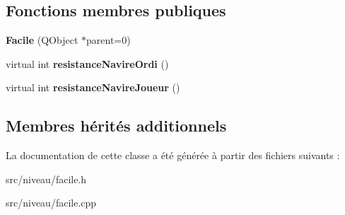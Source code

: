 \subsection*{Fonctions membres publiques}
\begin{DoxyCompactItemize}
\item 
{\bfseries Facile} (Q\+Object $\ast$parent=0)\hypertarget{class_facile_ab7147028ffb0ff80075d886fc173e471}{}\label{class_facile_ab7147028ffb0ff80075d886fc173e471}

\item 
virtual int {\bfseries resistance\+Navire\+Ordi} ()\hypertarget{class_facile_adb34e5aa4d1a2ae642496324c6df3495}{}\label{class_facile_adb34e5aa4d1a2ae642496324c6df3495}

\item 
virtual int {\bfseries resistance\+Navire\+Joueur} ()\hypertarget{class_facile_aa1f252c0a75eec896b11783f76b2ffbf}{}\label{class_facile_aa1f252c0a75eec896b11783f76b2ffbf}

\end{DoxyCompactItemize}
\subsection*{Membres hérités additionnels}


La documentation de cette classe a été générée à partir des fichiers suivants \+:\begin{DoxyCompactItemize}
\item 
src/niveau/facile.\+h\item 
src/niveau/facile.\+cpp\end{DoxyCompactItemize}
